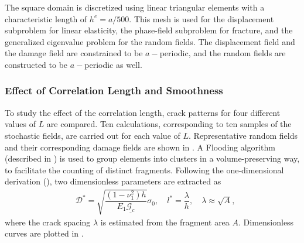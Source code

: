 The square domain is discretized using linear triangular elements with a characteristic length of $h^e = a/500$. This  mesh is used for the displacement subproblem for linear elasticity, the phase-field subproblem for fracture, and the generalized eigenvalue problem for the random fields. The displacement field and the damage field are constrained to be $a-$periodic, and the random fields are constructed to be $a-$periodic as well.

\subsubsection{Effect of Correlation Length and Smoothness}

To study the effect of the correlation length, crack patterns for four different values of $L$ are compared. Ten calculations, corresponding to ten samples of the stochastic fields, are carried out for each value of $L$. Representative random fields and their corresponding damage fields are shown in . A Flooding algorithm (described in ) is used to group elements into clusters in a volume-preserving way, to facilitate the counting of distinct fragments. Following the one-dimensional derivation (), two dimensionless parameters are extracted as
\begin{align}
   & \mathcal{D}^* = \sqrt{\dfrac{(1-\nu_1^2)h}{E_1\underline{\mathcal{G}_c}}}\sigma_0, \quad l^* = \dfrac{\lambda}{h}, \quad \lambda \approx \sqrt{A} ,
\end{align}
where the crack spacing $\lambda$ is estimated from the fragment area $A$. Dimensionless curves are plotted in .

